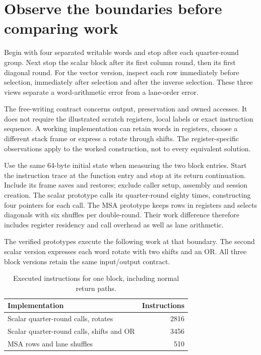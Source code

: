 \section{Observe the boundaries before comparing work}
Begin with four separated writable words and stop after each quarter-round group.
Next stop the scalar block after its first column round, then its first diagonal
round. For the vector version, inspect each row immediately before selection,
immediately after selection and after the inverse selection. These three views
separate a word-arithmetic error from a lane-order error.

The free-writing contract concerns output, preservation and owned accesses. It does
not require the illustrated scratch registers, local labels or exact instruction
sequence. A working implementation can retain words in registers, choose a different
stack frame or express a rotate through shifts. The register-specific observations
apply to the worked construction, not to every equivalent solution.

Use the same 64-byte initial state when measuring the two block entries. Start the
instruction trace at the function entry and stop at its return continuation. Include
its frame saves and restores; exclude caller setup, assembly and session creation.
The scalar prototype calls its quarter-round eighty times, constructing four pointers
for each call. The MSA prototype keeps rows in registers and selects diagonals with
six shuffles per double-round. Their work difference therefore includes register
residency and call overhead as well as lane arithmetic.

The verified prototypes execute the following work at that boundary. The second
scalar version expresses each word rotate with two shifts and an OR. All three
block versions retain the same input/output contract.

\begin{table}[htbp]\centering
  \caption{Executed instructions for one block, including normal return paths.}
  \begin{tabular}{lr}\toprule
    Implementation                            & Instructions \\\midrule
    Scalar quarter-round calls, rotates       & 2816         \\
    Scalar quarter-round calls, shifts and OR & 3456         \\
    MSA rows and lane shuffles                & 510          \\
    \bottomrule\end{tabular}\end{table}

